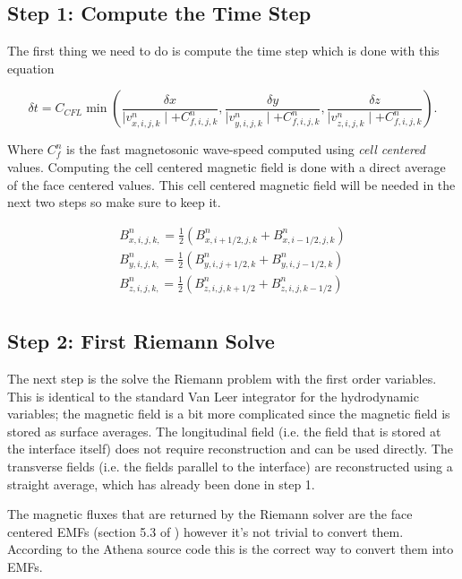 \subsection{Step 1: Compute the Time Step}

The first thing we need to do is compute the time step which is done with this equation

$$
    \delta t = C_{CFL} \min \left(
        \frac{\delta x}{\mid v^n_{x,i,j,k} \mid + C^n_{f,i,j,k}},
        \frac{\delta y}{\mid v^n_{y,i,j,k} \mid + C^n_{f,i,j,k}},
        \frac{\delta z}{\mid v^n_{z,i,j,k} \mid + C^n_{f,i,j,k}}
    \right).
$$

Where $ C^n_f $ is the fast magnetosonic wave-speed computed using \emph{cell centered} values. Computing the cell centered magnetic field is done with a direct average of the face centered values. This cell centered magnetic field will be needed in the next two steps so make sure to keep it.

$$
    \begin{aligned}
        B^n_{x,i,j,k,} = \frac{1}{2} \left( B^n_{x,i+1/2,j,k} + B^n_{x,i-1/2,j,k} \right) \\
        B^n_{y,i,j,k,} = \frac{1}{2} \left( B^n_{y,i,j+1/2,k} + B^n_{y,i,j-1/2,k} \right) \\
        B^n_{z,i,j,k,} = \frac{1}{2} \left( B^n_{z,i,j,k+1/2} + B^n_{z,i,j,k-1/2} \right) \\
    \end{aligned}
$$

\subsection{Step 2: First Riemann Solve}

The next step is the solve the Riemann problem with the first order variables. This is identical to the standard Van Leer integrator for the hydrodynamic variables; the magnetic field is a bit more complicated since the magnetic field is stored as surface averages. The longitudinal field (i.e. the field that is stored at the interface itself) does not require reconstruction and can be used directly. The transverse fields (i.e. the fields parallel to the interface) are reconstructed using a straight average, which has already been done in step 1.

The magnetic fluxes that are returned by the Riemann solver are the face centered EMFs (section 5.3 of \citeyear[Stone et. al][]{stone_athena_2008}) however it's not trivial to convert them. According to the Athena source code this is the correct way to convert them into EMFs.

